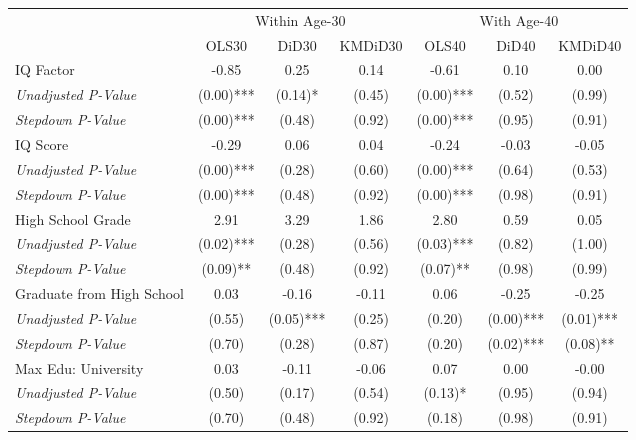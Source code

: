 \begin{tabular}{l c c c c c c}
\toprule
& \multicolumn{3}{c}{Within Age-30} & \multicolumn{3}{c}{With Age-40} \\\cmidrule(lr){2-4} \cmidrule(lr){5-7}
 & OLS30 & DiD30 & KMDiD30 & OLS40 & DiD40 & KMDiD40 \\
\midrule
IQ Factor & -0.85 & 0.25 & 0.14 & -0.61 & 0.10 & 0.00 \\
\quad \textit{Unadjusted P-Value} & (0.00)*** & (0.14)* & (0.45) & (0.00)*** & (0.52) & (0.99) \\
\quad \textit{Stepdown P-Value} & (0.00)*** & (0.48) & (0.92) & (0.00)*** & (0.95) & (0.91) \\
IQ Score & -0.29 & 0.06 & 0.04 & -0.24 & -0.03 & -0.05 \\
\quad \textit{Unadjusted P-Value} & (0.00)*** & (0.28) & (0.60) & (0.00)*** & (0.64) & (0.53) \\
\quad \textit{Stepdown P-Value} & (0.00)*** & (0.48) & (0.92) & (0.00)*** & (0.98) & (0.91) \\
High School Grade & 2.91 & 3.29 & 1.86 & 2.80 & 0.59 & 0.05 \\
\quad \textit{Unadjusted P-Value} & (0.02)*** & (0.28) & (0.56) & (0.03)*** & (0.82) & (1.00) \\
\quad \textit{Stepdown P-Value} & (0.09)** & (0.48) & (0.92) & (0.07)** & (0.98) & (0.99) \\
Graduate from High School & 0.03 & -0.16 & -0.11 & 0.06 & -0.25 & -0.25 \\
\quad \textit{Unadjusted P-Value} & (0.55) & (0.05)*** & (0.25) & (0.20) & (0.00)*** & (0.01)*** \\
\quad \textit{Stepdown P-Value} & (0.70) & (0.28) & (0.87) & (0.20) & (0.02)*** & (0.08)** \\
Max Edu: University & 0.03 & -0.11 & -0.06 & 0.07 & 0.00 & -0.00 \\
\quad \textit{Unadjusted P-Value} & (0.50) & (0.17) & (0.54) & (0.13)* & (0.95) & (0.94) \\
\quad \textit{Stepdown P-Value} & (0.70) & (0.48) & (0.92) & (0.18) & (0.98) & (0.91) \\
\bottomrule
\end{tabular}
